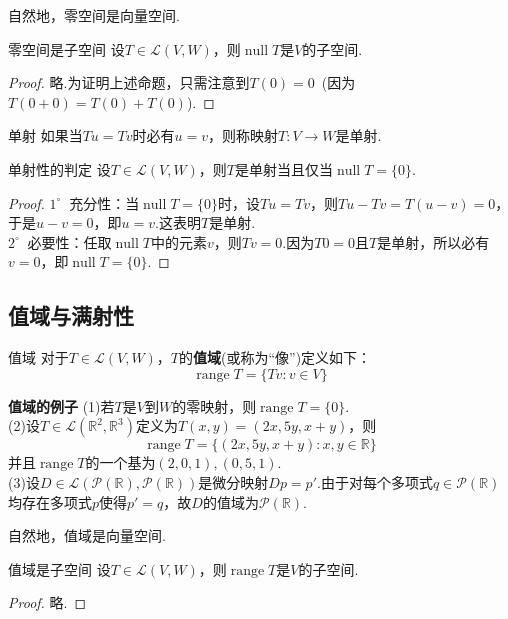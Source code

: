 \documentclass[lang=cn, zihao=5]{elegantbook}
\newcommand{\R}{\mathbb{R}}
\newcommand{\lmap}{\mathcal{L}}
\newcommand{\buzhou}[1]{$#1^{\circ} \ $}
\DeclareMathOperator{\nul}{null}
\DeclareMathOperator{\rge}{range}
\newcommand{\examplefont}[1]{\color{mgreen} \textbf{#1}}
\begin{document}
自然地，零空间是向量空间.

\begin{proposition}{零空间是子空间}
	设$T \in \lmap (V,W)$，则$\nul T$是$V$的子空间.
\end{proposition}
\begin{proof}
	略.为证明上述命题，只需注意到$T(0)=0$~(因为$T(0+0)=T(0)+T(0)$).
\end{proof}

\begin{definition}{单射}
	如果当$Tu=Tv$时必有$u=v$，则称映射$T:V \to W$是单射.
\end{definition}

\begin{proposition}{单射性的判定}
	设$T \in \lmap (V,W)$，则$T$是单射当且仅当$\nul T=\{ 0 \}$.
\end{proposition}
\begin{proof}
	\buzhou{1} 充分性：当$\nul T = \{ 0 \}$时，设$Tu=Tv$，则$Tu-Tv=T(u-v)=0$，于是$u-v=0$，即$u=v$.这表明$T$是单射. \\
	\buzhou{2} 必要性：任取$\nul T$中的元素$v$，则$Tv=0$.因为$T0=0$且$T$是单射，所以必有$v=0$，即$\nul T = \{ 0 \}$.
\end{proof}

\subsection{值域与满射性}

\begin{definition}{值域}
	对于$T \in \lmap (V,W)$，$T$的\textbf{值域}(或称为“像”)定义如下：$$\rge T = \{ Tv : v \in V \}$$
\end{definition}

\begin{example}{\examplefont{值域的例子}}
	(1)若$T$是$V$到$W$的零映射，则$\rge T=\{ 0 \}$. \\
	(2)设$T \in \lmap (\R ^2,\R ^3)$定义为$T(x,y)=(2x,5y,x+y)$，则$$\rge T = \{ (2x,5y,x+y):x,y \in \R \}$$
	并且$\rge T$的一个基为$(2,0,1),(0,5,1)$. \\
	(3)设$D \in \lmap (\mathcal{P}(\R ),\mathcal{P}(\R ))$是微分映射$Dp=p'$.由于对每个多项式$q \in \mathcal{P}(\R )$均存在多项式$p$使得$p'=q$，故$D$的值域为$\mathcal{P}(\R )$.
\end{example}

自然地，值域是向量空间.

\begin{proposition}{值域是子空间}
	设$T \in \lmap (V,W)$，则$\rge T$是$V$的子空间.
\end{proposition}
\begin{proof}
	略.
\end{proof}
\end{document}
